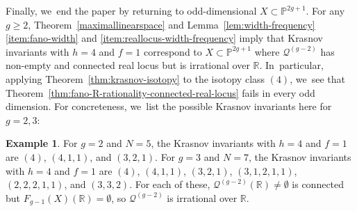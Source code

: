 \documentclass[JEP,XML,SOM,Unicode,NoEqCountersInSection,published]{cedram}
\let\cal\mathcal
\let\bb\mathbb\let\Bbb\mathbb
\theoremstyle{plain}
\theoremstyle{definition}
\newtheorem{exmp}[thm]{Example}
\begin{document}
Finally, we~end the paper by returning to odd-dimensional \(X\subset\bb P^{2g+1}\). For any \(g \geq 2\), Theorem~\ref{maximallinearspace} and Lemma~\ref{lem:width-frequency}\eqref{item:fano-width} and \eqref{item:reallocus-width-frequency} imply that Krasnov invariants with \(h=4\) and \(f=1\) correspond to \(X\subset\bb P^{2g+1}\) where \(\cal Q^{(g-2)}\) has non-empty and connected real locus but is irrational over \(\bb R\). In~particular, applying Theorem~\ref{thm:krasnov-isotopy} to the isotopy class \((4)\), we~see that Theorem~\ref{thm:fano-R-rationality-connected-real-locus} fails in every odd dimension. For concreteness, we~list the possible Krasnov invariants here for \(g=2,3\):

\begin{exmp}\label{exmp:odd-Q^g-2-connected-irrational}
For \(g=2\) and \(N=5\), the Krasnov invariants with \(h=4\) and \(f=1\) are \((4)\), \((4,1,1)\), and \((3,2,1)\). For \(g=3\) and \(N=7\), the Krasnov invariants with \(h=4\) and \(f=1\) are \((4)\), \((4,1,1)\), \((3,2,1)\), \((3,1,2,1,1)\), \((2,2,2,1,1)\), and \((3,3,2)\). For each of these, \(\cal Q^{(g-2)}(\bb R)\neq\emptyset\) is connected but \(F_{g-1}(X)(\bb R)=\emptyset\), so \(\cal Q^{(g-2)}\) is irrational over \(\bb R\).
\end{exmp}

\backmatter


\end{document}
